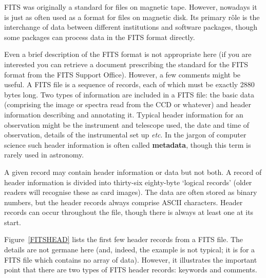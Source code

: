\documentclass[twoside,11pt]{starlink}
\begin{document}
FITS was originally a standard for files on magnetic tape.  However,
nowadays it is just as often used as a format for files on magnetic disk.
Its primary r\^{o}le is the interchange of data between different
institutions and software packages, though some packages can process data
in the FITS format directly.

Even a brief description of the FITS format is not appropriate here (if
you are interested you can retrieve a document prescribing the standard
for the FITS format from the FITS Support Office).  However, a few comments
might be useful.  A FITS file is a sequence of records, each of which
must be exactly 2880 bytes long.  Two types of information are included in
a FITS file: the basic data (comprising the image or spectra read from the
CCD or whatever) and header information describing and annotating it.
Typical header information for an observation might be the instrument and
telescope used, the date and time of observation, details of the
instrumental set up \emph{etc}.  In the jargon of computer science such
header information is often called \textbf{metadata}, though this term is
rarely used in astronomy.

A given record may contain header information or data but not both.  A
record of header information is divided into thirty-six eighty-byte
`logical records' (older readers will recognise these as card images).
The data are often stored as binary numbers, but the header records
always comprise ASCII characters.  Header records can occur throughout
the file, though there is always at least one at its start.

Figure~\ref{FITSHEAD} lists the first few header records from a FITS
file.  The details are not germane here (and, indeed, the example is
not typical; it is for a FITS file which contains no array of data).
However, it illustrates the important point that there are two types
of FITS header records: keywords and comments.
\end{document}
